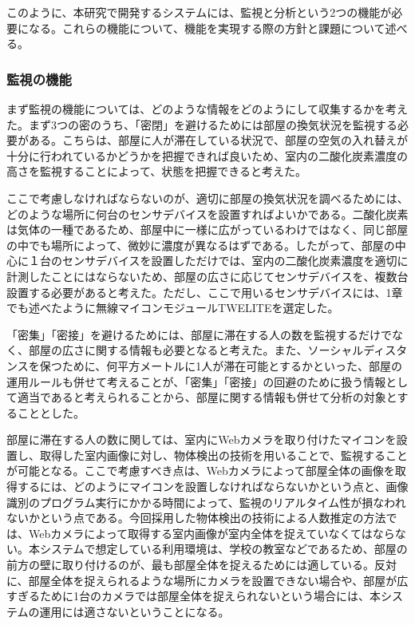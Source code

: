 このように、本研究で開発するシステムには、監視と分析という2つの機能が必要になる。これらの機能について、機能を実現する際の方針と課題について述べる。

\subsubsection*{監視の機能}

まず監視の機能については、どのような情報をどのようにして収集するかを考えた。まず3つの密のうち、「密閉」を避けるためには部屋の換気状況を監視する必要がある。こちらは、部屋に人が滞在している状況で、部屋の空気の入れ替えが十分に行われているかどうかを把握できれば良いため、室内の二酸化炭素濃度の高さを監視することによって、状態を把握できると考えた。

ここで考慮しなければならないのが、適切に部屋の換気状況を調べるためには、どのような場所に何台のセンサデバイスを設置すればよいかである。二酸化炭素は気体の一種であるため、部屋中に一様に広がっているわけではなく、同じ部屋の中でも場所によって、微妙に濃度が異なるはずである。したがって、部屋の中心に１台のセンサデバイスを設置しただけでは、室内の二酸化炭素濃度を適切に計測したことにはならないため、部屋の広さに応じてセンサデバイスを、複数台設置する必要があると考えた。ただし、ここで用いるセンサデバイスには、1章でも述べたように無線マイコンモジュールTWELITEを選定した。

「密集」「密接」を避けるためには、部屋に滞在する人の数を監視するだけでなく、部屋の広さに関する情報も必要となると考えた。また、ソーシャルディスタンスを保つために、何平方メートルに1人が滞在可能とするかといった、部屋の運用ルールも併せて考えることが、「密集」「密接」の回避のために扱う情報として適当であると考えられることから、部屋に関する情報も併せて分析の対象とすることとした。

部屋に滞在する人の数に関しては、室内にWebカメラを取り付けたマイコンを設置し、取得した室内画像に対し、物体検出の技術を用いることで、監視することが可能となる。ここで考慮すべき点は、Webカメラによって部屋全体の画像を取得するには、どのようにマイコンを設置しなければならないかという点と、画像識別のプログラム実行にかかる時間によって、監視のリアルタイム性が損なわれないかという点である。今回採用した物体検出の技術による人数推定の方法では、Webカメラによって取得する室内画像が室内全体を捉えていなくてはならない。本システムで想定している利用環境は、学校の教室などであるため、部屋の前方の壁に取り付けるのが、最も部屋全体を捉えるためには適している。反対に、部屋全体を捉えられるような場所にカメラを設置できない場合や、部屋が広すぎるために1台のカメラでは部屋全体を捉えられないという場合には、本システムの運用には適さないということになる。

